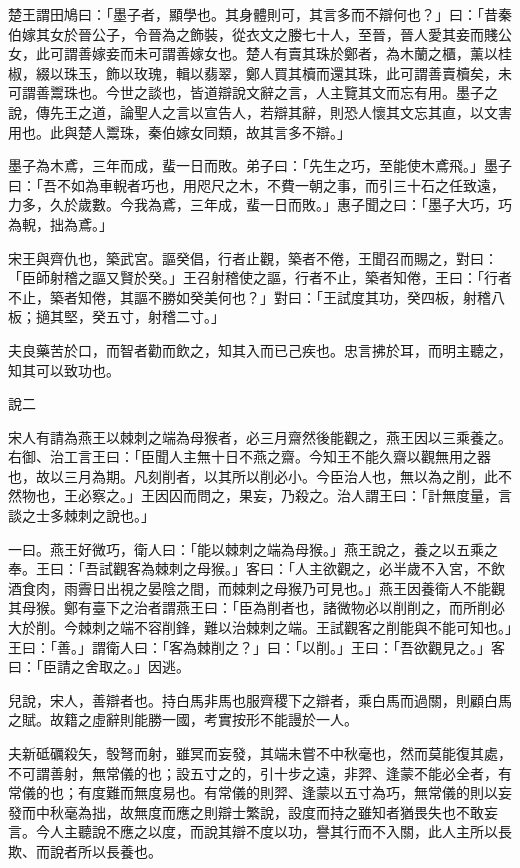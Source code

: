 \begin{pinyinscope}
楚王謂田鳩曰：「墨子者，顯學也。其身體則可，其言多而不辯何也？」曰：「昔秦伯嫁其女於晉公子，令晉為之飾裝，從衣文之媵七十人，至晉，晉人愛其妾而賤公女，此可謂善嫁妾而未可謂善嫁女也。楚人有賣其珠於鄭者，為木蘭之櫃，薰以桂椒，綴以珠玉，飾以玫瑰，輯以翡翠，鄭人買其櫝而還其珠，此可謂善賣櫝矣，未可謂善鬻珠也。今世之談也，皆道辯說文辭之言，人主覽其文而忘有用。墨子之說，傳先王之道，論聖人之言以宣告人，若辯其辭，則恐人懷其文忘其直，以文害用也。此與楚人鬻珠，秦伯嫁女同類，故其言多不辯。」

墨子為木鳶，三年而成，蜚一日而敗。弟子曰：「先生之巧，至能使木鳶飛。」墨子曰：「吾不如為車輗者巧也，用咫尺之木，不費一朝之事，而引三十石之任致遠，力多，久於歲數。今我為鳶，三年成，蜚一日而敗。」惠子聞之曰：「墨子大巧，巧為輗，拙為鳶。」

宋王與齊仇也，築武宮。謳癸倡，行者止觀，築者不倦，王聞召而賜之，對曰：「臣師射稽之謳又賢於癸。」王召射稽使之謳，行者不止，築者知倦，王曰：「行者不止，築者知倦，其謳不勝如癸美何也？」對曰：「王試度其功，癸四板，射稽八板；擿其堅，癸五寸，射稽二寸。」

夫良藥苦於口，而智者勸而飲之，知其入而已己疾也。忠言拂於耳，而明主聽之，知其可以致功也。

說二

宋人有請為燕王以棘刺之端為母猴者，必三月齋然後能觀之，燕王因以三乘養之。右御、治工言王曰：「臣聞人主無十日不燕之齋。今知王不能久齋以觀無用之器也，故以三月為期。凡刻削者，以其所以削必小。今臣治人也，無以為之削，此不然物也，王必察之。」王因囚而問之，果妄，乃殺之。治人謂王曰：「計無度量，言談之士多棘刺之說也。」

一曰。燕王好微巧，衛人曰：「能以棘刺之端為母猴。」燕王說之，養之以五乘之奉。王曰：「吾試觀客為棘刺之母猴。」客曰：「人主欲觀之，必半歲不入宮，不飲酒食肉，雨霽日出視之晏陰之間，而棘刺之母猴乃可見也。」燕王因養衛人不能觀其母猴。鄭有臺下之治者謂燕王曰：「臣為削者也，諸微物必以削削之，而所削必大於削。今棘刺之端不容削鋒，難以治棘刺之端。王試觀客之削能與不能可知也。」王曰：「善。」謂衛人曰：「客為棘削之？」曰：「以削。」王曰：「吾欲觀見之。」客曰：「臣請之舍取之。」因逃。

兒說，宋人，善辯者也。持白馬非馬也服齊稷下之辯者，乘白馬而過關，則顧白馬之賦。故籍之虛辭則能勝一國，考實按形不能謾於一人。

夫新砥礪殺矢，彀弩而射，雖冥而妄發，其端未嘗不中秋毫也，然而莫能復其處，不可謂善射，無常儀的也；設五寸之的，引十步之遠，非羿、逢蒙不能必全者，有常儀的也；有度難而無度易也。有常儀的則羿、逢蒙以五寸為巧，無常儀的則以妄發而中秋毫為拙，故無度而應之則辯士繁說，設度而持之雖知者猶畏失也不敢妄言。今人主聽說不應之以度，而說其辯不度以功，譽其行而不入關，此人主所以長欺、而說者所以長養也。


\end{pinyinscope}

